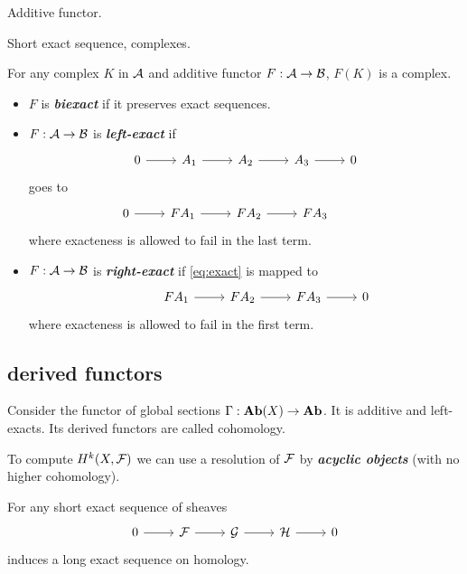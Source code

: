 \begin{defn}
	Additive functor.
\end{defn}
\begin{defn}
	Short exact sequence, complexes.
\end{defn}
\begin{remark}
	For any complex $K$ in $\mathcal{A}$ and additive functor $F:\mathcal{A}\to\mathcal{B}$, $F(K)$ is a complex.
\end{remark}
\begin{defn}
	\begin{itemize}
		\item $F$ is \textbf{\textit{biexact}} if it preserves exact sequences.
		\item $F:\mathcal{A}\to\mathcal{B}$ is \textbf{\textit{left-exact}} if 
		\begin{equation}\label{eq:exact}
			\begin{tikzcd}
			0\arrow[r]&A_1\arrow[r]&A_2\arrow[r]&A_3\arrow[r]&0
		\end{tikzcd}
		\end{equation}
		goes to
		\[\begin{tikzcd}
			0\arrow[r]&FA_1\arrow[r]&FA_2\arrow[r]&FA_3\arrow[r,phantom]& \leavevmode
		\end{tikzcd}\]
		where exacteness is allowed to fail in the last term.
		\item $F:\mathcal{A}\to\mathcal{B}$ is \textbf{\textit{right-exact}} if \cref{eq:exact} is mapped to
		\[\begin{tikzcd}
			\leavevmode\arrow[r,phantom]&FA_1\arrow[r]&FA_2\arrow[r]&FA_3\arrow[r]& 0
		\end{tikzcd}\]
		where exacteness is allowed to fail in the first term.
	\end{itemize}
\end{defn}

\subsection{derived functors}
Consider the functor of global sections $\Gamma:\mathbf{Ab}(X)\to\mathbf{Ab}$. It is additive and left-exacts. Its derived functors are called cohomology.

To compute $H^k(X,\mathcal{F})$ we can use a resolution of $\mathcal{F}$ by \textbf{\textit{acyclic objects}} (with no higher cohomology).

\begin{claim}
	For any short exact sequence of sheaves
	\[\begin{tikzcd}
		0\arrow[r]&\Fc\arrow[r]&\Gc\arrow[r]&\Hc\arrow[r]&0
	\end{tikzcd}\]
	induces a long exact sequence on homology.
\end{claim}

